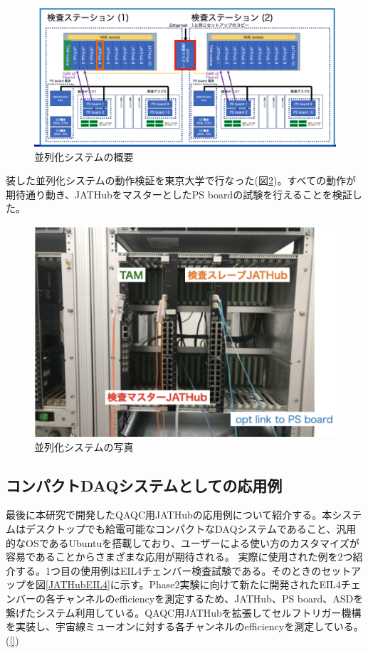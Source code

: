 \begin{figure} 
\centering
\includegraphics[width=16cm]{fig/QAQC/QAQCpararell.png}
\caption[並列化システムの概要]{並列化システムの概要}
\label{QAQCpararell}
\end{figure}
装した並列化システムの動作検証を東京大学で行なった(図\ref{QAQCpararellpicture})。すべての動作が期待通り動き、JATHubをマスターとしたPS boardの試験を行えることを検証した。

\begin{figure} 
\centering
\includegraphics[width=16cm]{fig/QAQC/QAQCpararellpicture.png}
\caption[並列化システムの写真]{並列化システムの写真}
\label{QAQCpararellpicture}
\end{figure}

\subsection{コンパクトDAQシステムとしての応用例}
\label{subsec_compactdaq}
最後に本研究で開発したQAQC用JATHubの応用例について紹介する。本システムはデスクトップでも給電可能なコンパクトなDAQシステムであること、汎用的なOSであるUbuntuを搭載しており、ユーザーによる使い方のカスタマイズが容易であることからさまざまな応用が期待される。
実際に使用された例を2つ紹介する。1つ目の使用例はEIL4チェンバー検査試験である。そのときのセットアップを図\ref{JATHubEIL4}に示す。Phase2実験に向けて新たに開発されたEIL4チェンバーの各チャンネルのefficiencyを測定するため、JATHub、PS board、ASDを繋げたシステム利用している。QAQC用JATHubを拡張してセルフトリガー機構を実装し、宇宙線ミューオンに対する各チャンネルのefficiencyを測定している。
\baselineskip(\ref{})


